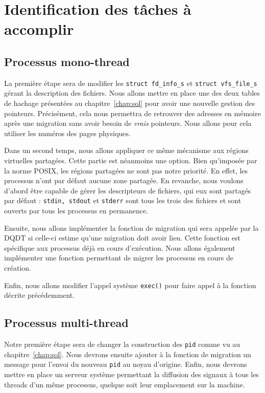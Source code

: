 \chapter{Identification des tâches à accomplir}
\label{chap:tasks}


  \section{Processus mono-thread}

    La première étape sera de modifier les \texttt{struct fd\_info\_s} et
    \texttt{struct vfs\_file\_s} gérant la description des fichiers. Nous allons
    mettre en place une des deux tables de hachage présentées au
    chapitre~\ref{chap:sol} pour avoir une nouvelle gestion des
    pointeurs. Précisément, cela nous permettra de retrouver des adresses en
    mémoire après une migration sans avoir besoin de \textit{vrais}
    pointeurs. Nous allons pour cela utiliser les numéros des pages physiques.

    Dans un second temps, nous allons appliquer ce même mécanisme aux régions
    virtuelles partagées. Cette partie est néanmoins une option. Bien qu'imposée
    par la norme POSIX, les régions partagées ne sont pas notre priorité. En
    effet, les processus n'ont par défaut aucune zone partagée. En revanche,
    nous voulons d'abord être capable de gérer les descripteurs de fichiers, qui
    eux sont partagés par défaut : \texttt{stdin, stdout} et \texttt{stderr}
    sont tous les trois des fichiers et sont ouverts par tous les processus en
    permanence.

    Ensuite, nous allons implémenter la fonction de migration qui sera appelée
    par la DQDT si celle-ci estime qu'une migration doit avoir lieu. Cette
    fonction est spécifique aux processus déjà en cours d'exécution. Nous allons
    également implémenter une fonction permettant de migrer les processus en
    cours de création.
    
    Enfin, nous allons modifier l'appel système \texttt{exec()} pour faire appel
    à la fonction décrite précédemment.


  \section{Processus multi-thread}

    Notre première étape sera de changer la construction des \texttt{pid} comme
    vu au chapitre~\ref{chap:sol}. Nous devrons ensuite ajouter à la fonction de
    migration un message pour l'envoi du nouveau \texttt{pid} au noyau
    d'origine. Enfin, nous devrons mettre en place un serveur système permettant
    la diffusion des signaux à tous les threads d'un même processus, quelque
    soit leur emplacement sur la machine.


